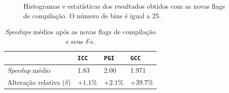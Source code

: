\begin{figure}[ht!]
	\vspace{0mm}	%
	\begin{center}
	\end{center}
	\vspace{2mm}	%
	\caption{Histogramas e estatísticas dos resultados obtidos com as novas flags de compilação. O número de bins é igual a 25.}
	\legenda{}	%
	\label{fig:2_hist}
\vspace{-8mm}
\end{figure}


\begin{table}[H]
\center
\caption{\textit{Speedups} médios após as novas flags de compilação e seus  $\delta$'s.} 
\begin{tabular}{@{}l l l l@{}}
\toprule
& \texttt{ICC} & \texttt{PGI} &  \texttt{GCC} \\
\midrule
\textit{Speedup} médio & 1.83 & 2.00 & 1.971 \\ 
Alteração relativa ($\delta$) & $+1.1\%$ & $+2.1\%$ & $+39.7\%$ \\ 
\bottomrule
\end{tabular}
\label{tab:2_spedups}
\vspace{-10mm}
\end{table}


